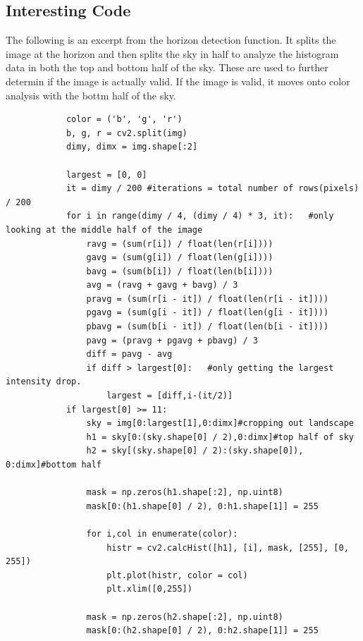 \documentclass[onecolumn, draftclsnofoot,10pt, compsoc]{IEEEtran}
\begin{document}
\begin{singlespace}
	\section{Interesting Code}
		The following is an excerpt from the horizon detection function. It splits the image at the horizon and then splits the sky in half to analyze the histogram data in both the top and bottom half of the sky.
		These are used to further determin if the image is actually valid.
		If the image is valid, it moves onto color analysis with the bottm half of the sky.
		\begin{lstlisting}
			color = ('b', 'g', 'r')
			b, g, r = cv2.split(img)
			dimy, dimx = img.shape[:2]

			largest = [0, 0]
			it = dimy / 200 #iterations = total number of rows(pixels) / 200
			for i in range(dimy / 4, (dimy / 4) * 3, it):   #only looking at the middle half of the image
				ravg = (sum(r[i]) / float(len(r[i])))
				gavg = (sum(g[i]) / float(len(g[i])))
				bavg = (sum(b[i]) / float(len(b[i])))
				avg = (ravg + gavg + bavg) / 3
				pravg = (sum(r[i - it]) / float(len(r[i - it])))
				pgavg = (sum(g[i - it]) / float(len(g[i - it])))
				pbavg = (sum(b[i - it]) / float(len(b[i - it])))
				pavg = (pravg + pgavg + pbavg) / 3
				diff = pavg - avg
				if diff > largest[0]:   #only getting the largest intensity drop.
					largest = [diff,i-(it/2)]
			if largest[0] >= 11:
				sky = img[0:largest[1],0:dimx]#cropping out landscape
				h1 = sky[0:(sky.shape[0] / 2),0:dimx]#top half of sky
				h2 = sky[(sky.shape[0] / 2):(sky.shape[0]), 0:dimx]#bottom half

				mask = np.zeros(h1.shape[:2], np.uint8)
				mask[0:(h1.shape[0] / 2), 0:h1.shape[1]] = 255

				for i,col in enumerate(color):
					histr = cv2.calcHist([h1], [i], mask, [255], [0, 255])
					plt.plot(histr, color = col)
					plt.xlim([0,255])

				mask = np.zeros(h2.shape[:2], np.uint8)
				mask[0:(h2.shape[0] / 2), 0:h2.shape[1]] = 255


\end{lstlisting}
\end{singlespace}
\end{document}
